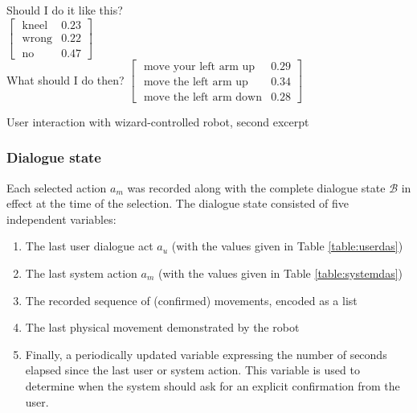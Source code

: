 \begin{Transcript}[p!]
\begin{dialogue}
 \vspace{3mm}
 Should I do it like this? \\
 $\begin{bmatrix}\text{ kneel} & 0.23 \\
\text{ wrong} & 0.22 \\
\text{ no} & 0.47 \end{bmatrix}$ \vspace{3mm} \\
 \vspace{2mm}
 What should I do then?  \vspace{3mm}
 $\begin{bmatrix}\text{ move your left arm up} & 0.29 \\
\text{ move the left arm up} & 0.34 \\
\text{ move the left arm down} & 0.28 \end{bmatrix}$ \vspace{3mm} \\
\end{dialogue}
\vspace{-4mm} \hspace{1cm}  \vspace{3mm}
\caption{User interaction with wizard-controlled robot, second excerpt}
\end{Transcript}

\subsubsection*{Dialogue state}
Each selected action $a_m$ was recorded along with the complete dialogue state $\mathcal{B}$ in effect at the time of the selection. The dialogue state consisted of five independent variables: \begin{enumerate}
\item The last user dialogue act $a_u$ (with the values given in Table \ref{table:userdas})
\item The last system action $a_m$ (with the values given in Table \ref{table:systemdas})
\item The recorded sequence of (confirmed) movements, encoded as a list
\item The last physical movement demonstrated by the robot
\item Finally, a periodically updated variable expressing the number of seconds elapsed since the last user or system action.  This variable is used to determine when the system should ask for an explicit confirmation from the user.
\end{enumerate}

